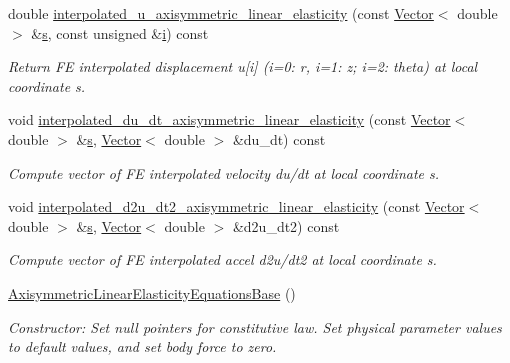 \begin{DoxyCompactItemize}
double \hyperlink{classoomph_1_1AxisymmetricLinearElasticityEquationsBase_af7660a53ff93c55f3c0c6f634ac2dd80}{interpolated\+\_\+u\+\_\+axisymmetric\+\_\+linear\+\_\+elasticity} (const \hyperlink{classoomph_1_1Vector}{Vector}$<$ double $>$ \&\hyperlink{cfortran_8h_ab7123126e4885ef647dd9c6e3807a21c}{s}, const unsigned \&\hyperlink{cfortran_8h_adb50e893b86b3e55e751a42eab3cba82}{i}) const
\begin{DoxyCompactList}\small\item\em Return FE interpolated displacement u\mbox{[}i\mbox{]} (i=0\+: r, i=1\+: z; i=2\+: theta) at local coordinate s. \end{DoxyCompactList}\item 
void \hyperlink{classoomph_1_1AxisymmetricLinearElasticityEquationsBase_a9b517ddf75cc1a62fbce45d8333cbcaa}{interpolated\+\_\+du\+\_\+dt\+\_\+axisymmetric\+\_\+linear\+\_\+elasticity} (const \hyperlink{classoomph_1_1Vector}{Vector}$<$ double $>$ \&\hyperlink{cfortran_8h_ab7123126e4885ef647dd9c6e3807a21c}{s}, \hyperlink{classoomph_1_1Vector}{Vector}$<$ double $>$ \&du\+\_\+dt) const
\begin{DoxyCompactList}\small\item\em Compute vector of FE interpolated velocity du/dt at local coordinate s. \end{DoxyCompactList}\item 
void \hyperlink{classoomph_1_1AxisymmetricLinearElasticityEquationsBase_a5fd012d570d52057193e0799a3150f20}{interpolated\+\_\+d2u\+\_\+dt2\+\_\+axisymmetric\+\_\+linear\+\_\+elasticity} (const \hyperlink{classoomph_1_1Vector}{Vector}$<$ double $>$ \&\hyperlink{cfortran_8h_ab7123126e4885ef647dd9c6e3807a21c}{s}, \hyperlink{classoomph_1_1Vector}{Vector}$<$ double $>$ \&d2u\+\_\+dt2) const
\begin{DoxyCompactList}\small\item\em Compute vector of FE interpolated accel d2u/dt2 at local coordinate s. \end{DoxyCompactList}\item 
\hyperlink{classoomph_1_1AxisymmetricLinearElasticityEquationsBase_aa37df6e9aef3ee1326187b1c51197527}{Axisymmetric\+Linear\+Elasticity\+Equations\+Base} ()
\begin{DoxyCompactList}\small\item\em Constructor\+: Set null pointers for constitutive law. Set physical parameter values to default values, and set body force to zero. \end{DoxyCompactList}\item 

\end{DoxyCompactItemize}
